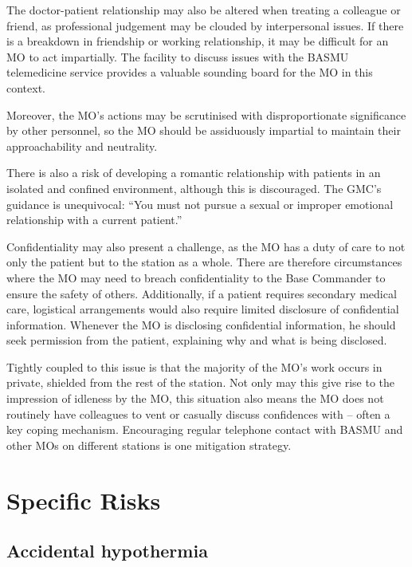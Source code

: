 \documentclass[12pt,a4paper]{article}
\begin{document}
The doctor-patient relationship may also be altered when treating a colleague or friend, as professional judgement may be clouded by interpersonal issues. If there is a breakdown in friendship or working relationship, it may be difficult for an MO to act impartially. The facility to discuss issues with the BASMU telemedicine service provides a valuable sounding board for the MO in this context.

Moreover, the MO's actions may be scrutinised with disproportionate significance by other personnel, so the MO should be assiduously impartial to maintain their approachability and neutrality.

There is also a risk of developing a romantic relationship with patients in an isolated and confined environment, although this is discouraged. The GMC's guidance is unequivocal: ``You must not pursue a sexual or improper emotional relationship with a current patient.''\cite{Anonymous:2013wj,Anonymous:2013ve}

Confidentiality may also present a challenge, as the MO has a duty of care to not only the patient but to the station as a whole. There are therefore circumstances where the MO may need to breach confidentiality to the Base Commander to ensure the safety of others. Additionally, if a patient requires secondary medical care, logistical arrangements would also require limited disclosure of confidential information. Whenever the MO is disclosing confidential information, he should seek permission from the patient, explaining why and what is being disclosed.\cite{Anonymous:2013ta}

Tightly coupled to this issue is that the majority of the MO's work occurs in private, shielded from the rest of the station. Not only may this give rise to the impression of idleness by the MO, this situation also means the MO does not routinely have colleagues to vent or casually discuss confidences with -- often a key coping mechanism. Encouraging regular telephone contact with BASMU and other MOs on different stations is one mitigation strategy.

\section{Specific Risks}

\subsection{Accidental hypothermia}
\end{document}
